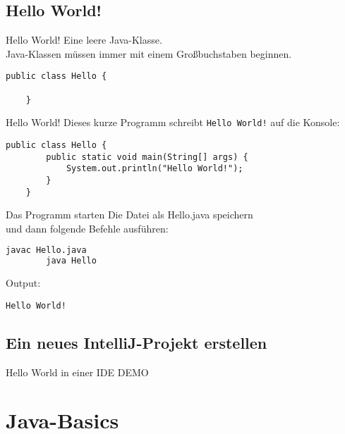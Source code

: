 \subsection{Hello World!}

\begin{frame}[fragile]{Hello World!}
	Eine leere Java-Klasse. \\
    Java-Klassen müssen immer mit einem Großbuchstaben beginnen.
    \begin{lstlisting}[gobble=4]
    public class Hello {

    }\end{lstlisting}
\end{frame}

\begin{frame}[fragile]{Hello World!}
    Dieses kurze Programm schreibt \texttt{Hello World!} auf die Konsole:
    \begin{lstlisting}[gobble=4]
    public class Hello {
        public static void main(String[] args) {
            System.out.println("Hello World!");
        }
    }\end{lstlisting}
\end{frame}

\begin{frame}[fragile]{Das Programm starten}
    Die Datei als Hello.java speichern \\ und dann folgende Befehle ausführen:
   \begin{lstlisting}[language=bash, gobble=8]
        javac Hello.java
        java Hello\end{lstlisting}
    Output:
    \begin{lstlisting}[gobble=8] 
        Hello World! \end{lstlisting}
\end{frame}

\subsection{Ein neues IntelliJ-Projekt erstellen}

\begin{frame}{Hello World in einer IDE}
   DEMO
\end{frame}

\section{Java-Basics}

